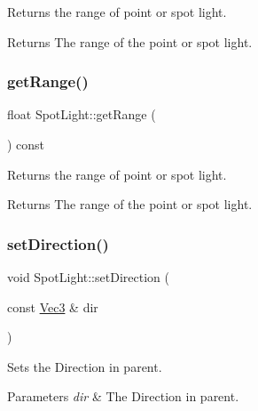 Returns the range of point or spot light.

\begin{DoxyReturn}{Returns}
The range of the point or spot light. 
\end{DoxyReturn}
\mbox{\label{classSpotLight_a5309f78c0a001e377947df39b257d31e}} 
\subsubsection{\texorpdfstring{get\+Range()}{getRange()}\hspace{0.1cm}{\footnotesize\ttfamily [2/2]}}
{\footnotesize\ttfamily float Spot\+Light\+::get\+Range (\begin{DoxyParamCaption}{ }\end{DoxyParamCaption}) const\hspace{0.3cm}{\ttfamily [inline]}}

Returns the range of point or spot light.

\begin{DoxyReturn}{Returns}
The range of the point or spot light. 
\end{DoxyReturn}
\mbox{\label{classSpotLight_aa19a816de0b0dcca2a020655ac256684}} 
\subsubsection{\texorpdfstring{set\+Direction()}{setDirection()}\hspace{0.1cm}{\footnotesize\ttfamily [1/2]}}
{\footnotesize\ttfamily void Spot\+Light\+::set\+Direction (\begin{DoxyParamCaption}\item[{const \hyperlink{classVec3}{Vec3} \&}]{dir }\end{DoxyParamCaption})}

Sets the Direction in parent.


\begin{DoxyParams}{Parameters}
{\em dir} & The Direction in parent. \\
\hline
\end{DoxyParams}
\mbox{\label{classSpotLight_aa19a816de0b0dcca2a020655ac256684}} 
